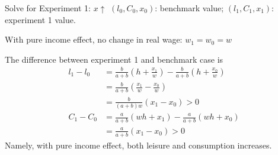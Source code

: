 \documentclass[11pt,aspectratio=169,usenames,dvipsnames]{beamer}
\begin{document}
\begin{frame}{Solve for Experiment 1: $ x \uparrow  $}
\label{slide:Solve_for_Experiment_1____x__uparrow_______}
$ (l_{0}, C_{0}, x_{0} )$: benchmark value;
$ (l_{1}, C_{1}, x_{1} )$: experiment 1 value.

With pure income effect, \alert{no change in real wage}: $ w_{1} = w_{0} = w$

The difference between experiment 1 and benchmark case is
%
\begin{align}
    l_{1} - l_{0}
        & = \frac{b}{a+b} \left( h + \frac{x_{1}}{w} \right)
          - \frac{b}{a+b} \left( h + \frac{x_{0}}{w} \right)
    \\
        & = \frac{b}{a+b} \left( \frac{x_{1}}{w} - \frac{x_{0}}{w} \right)
    \\
        & = \frac{b}{(a+b)w} \left( x_{1} - x_{0} \right) > 0
    \\
    C_{1} - C_{0}
        & = \frac{a}{a+b} \left( wh + x_{1} \right)
          - \frac{a}{a+b} \left( wh + x_{0} \right)
    \\
        & = \frac{a}{a+b} \left( x_{1} - x_{0} \right) > 0
\end{align}
%
Namely, with pure income effect, \alert{both leisure and consumption increases}.
\end{frame}
\end{document}
